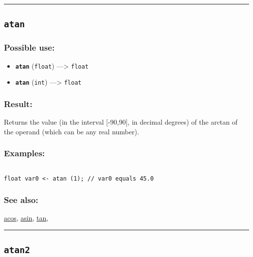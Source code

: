 \documentclass[]{book}
\providecommand{\tightlist}{%
  \setlength{\itemsep}{0pt}\setlength{\parskip}{0pt}}
\theoremstyle{definition}
\theoremstyle{definition}
\theoremstyle{definition}
\theoremstyle{remark}
\begin{document}
\begin{center}\rule{0.5\linewidth}{\linethickness}\end{center}

\subsection{\texorpdfstring{\texttt{atan}}{atan}}\label{atan}

\subsubsection{Possible use:}\label{possible-use-59}

\begin{itemize}
\tightlist
\item
  \textbf{\texttt{atan}} (\texttt{float}) ---\textgreater{}
  \texttt{float}
\item
  \textbf{\texttt{atan}} (\texttt{int}) ---\textgreater{} \texttt{float}
\end{itemize}

\subsubsection{Result:}\label{result-58}

Returns the value (in the interval {[}-90,90{]}, in decimal degrees) of
the arctan of the operand (which can be any real number).

\subsubsection{Examples:}\label{examples-49}

\begin{verbatim}
 
float var0 <- atan (1); // var0 equals 45.0
\end{verbatim}

\subsubsection{See also:}\label{see-also-41}

\href{OperatorsAA\#acos}{acos}, \href{OperatorsAA\#asin}{asin},
\href{OperatorsSZ\#tan}{tan},

\begin{center}\rule{0.5\linewidth}{\linethickness}\end{center}

\subsection{\texorpdfstring{\texttt{atan2}}{atan2}}\label{atan2}
\end{document}

